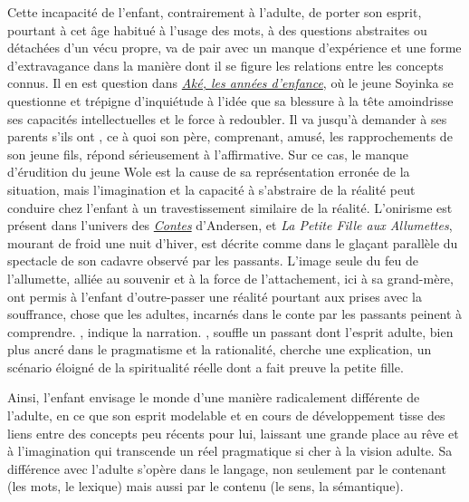 \documentclass[a4paper,french,bookmarks]{article}
\begin{document}
\qquad Cette incapacité de l'enfant, contrairement à l'adulte, de porter son esprit, pourtant à cet âge habitué à l'usage des mots, à des questions abstraites ou détachées d'un vécu propre, va de pair avec un manque d'expérience et une forme d'extravagance dans la manière dont il se figure les relations entre les concepts connus. Il en est question dans \underline{\itshape Aké, les années d'enfance}, où le jeune Soyinka se questionne et trépigne d'inquiétude à l'idée que sa blessure à la tête amoindrisse ses capacités intellectuelles et le force à redoubler. Il va jusqu'à demander à ses parents s'ils ont , ce à quoi son père, comprenant, amusé, les rapprochements de son jeune fils, répond sérieusement à l'affirmative. Sur ce cas, le manque d'érudition du jeune Wole est la cause de sa représentation erronée de la situation, mais l'imagination et la capacité à s'abstraire de la réalité peut conduire chez l'enfant à un travestissement similaire de la réalité. L'onirisme est présent dans l'univers des \underline{\itshape Contes} d'Andersen, et \textit{La Petite Fille aux Allumettes}, mourant de froid une nuit d'hiver, est décrite comme  dans le glaçant parallèle du spectacle de son cadavre observé par les passants. L'image seule du feu de l'allumette, alliée au souvenir et à la force de l'attachement, ici à sa grand-mère, ont permis à l'enfant d'outre-passer une réalité pourtant aux prises avec la souffrance, chose que les adultes, incarnés dans le conte par les passants peinent à comprendre. , indique la narration. , souffle un passant dont l'esprit adulte, bien plus ancré dans le pragmatisme et la rationalité, cherche une explication, un scénario éloigné de la spiritualité réelle dont a fait preuve la petite fille.

\qquad Ainsi, l'enfant envisage le monde d'une manière radicalement différente de l'adulte, en ce que son esprit modelable et en cours de développement tisse des liens entre des concepts peu récents pour lui, laissant une grande place au rêve et à l'imagination qui transcende un réel pragmatique si cher à la vision adulte. Sa différence avec l'adulte s'opère dans le langage, non seulement par le contenant (les mots, le lexique) mais aussi par le contenu (le sens, la sémantique). 

\text{}\\[20pt]
\end{document}
